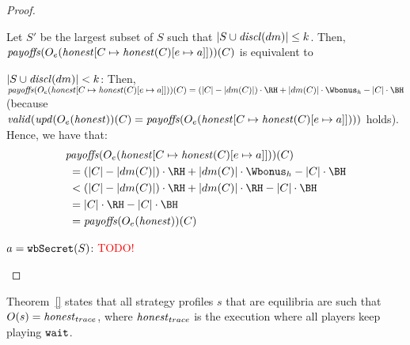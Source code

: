 \begin{proof}
\begin{compactitem}
\begin{compactitem}
\begin{compactitem}
Let $S'$ be the largest subset of $S$ such that $|S \cup \disclosed{dm}| \leq k$.
%
Then, $\payoffs(\subgameOutcome{\honest[C \mapsto \honest(C)[e \mapsto a]]}{e})(C)$ is equivalent to  

\item[$|S \cup \disclosed{dm}| < k$:] 
%
Then, $\payoffs(\subgameOutcome{\honest[C \mapsto \honest(C)[e \mapsto a]]}{e})(C) = (|C| - |dm(C)|) \cdot \RH + |dm(C)| \cdot \Wbonus_h - |C| \cdot \BH$ (because $\valid{\update{\subgameOutcome{\honest}{e})(C) = \payoffs(\subgameOutcome{\honest[C \mapsto \honest(C)[e \mapsto a]]}{e}}}$ holds).
%
Hence, we have that:
	\begin{align*}
			&\payoffs(\subgameOutcome{\honest[C \mapsto \honest(C)[e \mapsto a]]}{e})(C) \\
			&\ = (|C| - |dm(C)|) \cdot \RH + |dm(C)| \cdot \Wbonus_h - |C| \cdot \BH \\  
			&\ < (|C| - |dm(C)|) \cdot \RH + |dm(C)| \cdot \RH - |C| \cdot \BH \\	%
			&\ = |C|  \cdot \RH - |C| \cdot \BH \\ 
			&\ = \payoffs(\subgameOutcome{\honest}{e})(C) %
	\end{align*}


\end{compactitem}







\item[$a = \wSecret{S}$:]
%
\textcolor{red}{TODO!}

\end{compactitem}
\end{compactitem}



%
\end{proof}

Theorem~\ref{} states that all strategy profiles $s$ that are equilibria are such that $O(s) = \honest_{trace}$, where $\honest_{trace}$ is the execution where all players keep playing $\wait$.

